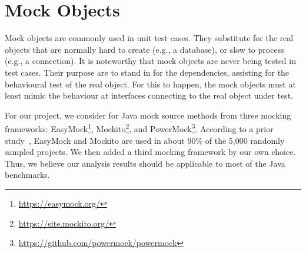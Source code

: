 \section{Mock Objects} 

Mock objects are commonly used in unit test cases. They substitute for the real objects that are normally hard to create (e.g., a database), or slow to process (e.g., a connection). It is noteworthy that mock objects are never being tested in test cases. Their purpose are to stand in for the dependencies, assisting for the behavioural test of the real object. For this to happen, the mock objects must at least mimic the behaviour at interfaces connecting to the real object under test.

For our project, we consider for Java mock source methods from three mocking frameworks: EasyMock\footnote{\url{https://easymock.org/}}, Mockito\footnote{\url{https://site.mockito.org/}}, and PowerMock\footnote{\url{https://github.com/powermock/powermock}}. According to a prior study~\cite{mostafa14:_empirical_study_mock_frameworks}, EasyMock and Mockito are used in about 90\% of the 5,000 randomly sampled projects. We then added a third mocking framework by our own choice. Thus, we believe our analysis results should be applicable to most of the Java benchmarks. 